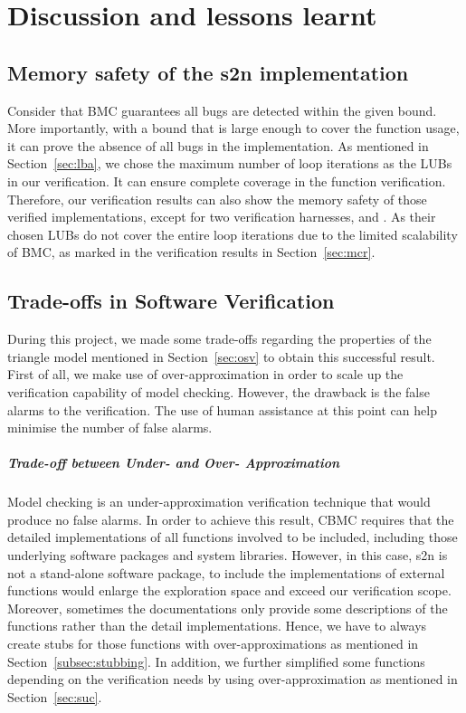 \chapter{Discussion and lessons learnt}
\section{Memory safety of the s2n implementation}
Consider that BMC guarantees all bugs are detected within the given bound. More importantly, with a bound that is large enough to cover the function usage, it can prove the absence of all bugs in the implementation. As mentioned in Section~\ref{sec:lba}, we chose the maximum number of loop iterations as the LUBs in our verification. It can ensure complete coverage in the function verification. Therefore, our verification results can also show the memory safety of those verified implementations, except for two verification harnesses,  and . As their chosen LUBs do not cover the entire loop iterations due to the limited scalability of BMC, as marked in the verification results in Section~\ref{sec:mcr}.

\section{Trade-offs in Software Verification}
During this project, we made some trade-offs regarding the properties of the triangle model mentioned in Section~\ref{sec:osv} to obtain this successful result. First of all, we make use of over-approximation in order to scale up the verification capability of model checking. However, the drawback is the false alarms to the verification. The use of human assistance at this point can help minimise the number of false alarms.

\paragraph{Trade-off between Under- and Over- Approximation}
Model checking is an under-approximation verification technique that would produce no false alarms. In order to achieve this result, CBMC requires that the detailed implementations of all functions involved to be included, including those underlying software packages and system libraries. However, in this case, s2n is not a stand-alone software package, to include the implementations of external functions would enlarge the exploration space and exceed our verification scope. Moreover, sometimes the documentations only provide some descriptions of the functions rather than the detail implementations. Hence, we have to always create stubs for those functions with over-approximations as mentioned in Section~\ref{subsec:stubbing}. In addition, we further simplified some functions depending on the verification needs by using over-approximation as mentioned in Section~\ref{sec:suc}.

